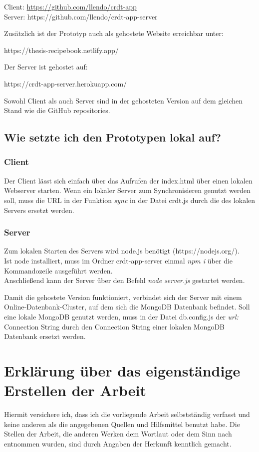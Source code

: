 \documentclass[a4paper, 12pt]{scrreprt}
\begin{document}
Client: \url{https://github.com/llendo/crdt-app}\\
Server: https://github.com/llendo/crdt-app-server


Zusätzlich ist der Prototyp auch als gehostete Website erreichbar unter: 

https://thesis-recipebook.netlify.app/

Der Server ist gehostet auf: 

https://crdt-app-server.herokuapp.com/


Sowohl Client als auch Server sind in der gehosteten Version auf dem gleichen Stand wie die GitHub repositories. 

\subsection*{Wie setzte ich den Prototypen lokal auf?}

\subsubsection*{Client}
Der Client lässt sich einfach über das Aufrufen der index.html über einen lokalen Webserver starten. Wenn ein lokaler Server zum Synchronisieren genutzt werden soll, muss die URL in der Funktion \textit{sync} in der Datei crdt.js durch die des lokalen Servers ersetzt werden.

\subsubsection*{Server}
Zum lokalen Starten des Servers wird node.js benötigt (https://nodejs.org/). \\
Ist node installiert, muss im Ordner crdt-app-server einmal \textit{npm i} über die Kommandozeile ausgeführt werden. \\
Anschließend kann der Server über den Befehl \textit{node server.js} gestartet werden.

Damit die gehostete Version funktioniert, verbindet sich der Server mit einem Online-Datenbank-Cluster, auf dem sich die MongoDB Datenbank befindet. Soll eine lokale MongoDB genutzt werden, muss in der Datei db.config.js der \textit{url:} Connection String durch den Connection String einer lokalen MongoDB Datenbank ersetzt werden. 

\thispagestyle{empty}
\newpage
\thispagestyle{empty}
\section*{Erklärung über das eigenständige Erstellen der Arbeit}
	Hiermit versichere ich, dass ich die vorliegende Arbeit selbstständig verfasst und keine anderen als die angegebenen Quellen und Hilfsmittel benutzt habe. Die Stellen der Arbeit, die anderen Werken dem Wortlaut oder dem Sinn nach entnommen wurden, sind durch Angaben der Herkunft kenntlich gemacht.
	
\end{document}
